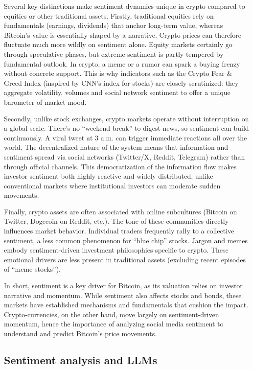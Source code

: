 \documentclass[
  a4paper]{article}
\begin{document}
Several key distinctions make sentiment dynamics unique in crypto
compared to equities or other traditional assets. Firstly, traditional
equities rely on fundamentals (earnings, dividends) that anchor
long-term value, whereas Bitcoin's value is essentially shaped by a
narrative. Crypto prices can therefore fluctuate much more wildly on
sentiment alone. Equity markets certainly go through speculative phases,
but extreme sentiment is partly tempered by fundamental outlook. In
crypto, a meme or a rumor can spark a buying frenzy without concrete
support. This is why indicators such as the Crypto Fear \& Greed Index
(inspired by CNN's index for stocks) are closely scrutinized: they
aggregate volatility, volumes and social network sentiment to offer a
unique barometer of market mood.

Secondly, unlike stock exchanges, crypto markets operate without
interruption on a global scale. There's no ``weekend break'' to digest
news, so sentiment can build continuously. A viral tweet at 3 a.m. can
trigger immediate reactions all over the world. The decentralized nature
of the system means that information and sentiment spread via social
networks (Twitter/X, Reddit, Telegram) rather than through official
channels. This democratization of the information flow makes investor
sentiment both highly reactive and widely distributed, unlike
conventional markets where institutional investors can moderate sudden
movements.

Finally, crypto assets are often associated with online subcultures
(Bitcoin on Twitter, Dogecoin on Reddit, etc.). The tone of these
communities directly influences market behavior. Individual traders
frequently rally to a collective sentiment, a less common phenomenon for
``blue chip'' stocks. Jargon and memes embody sentiment-driven
investment philosophies specific to crypto. These emotional drivers are
less present in traditional assets (excluding recent episodes of ``meme
stocks'').

In short, sentiment is a key driver for Bitcoin, as its valuation relies
on investor narrative and momentum. While sentiment also affects stocks
and bonds, these markets have established mechanisms and fundamentals
that cushion the impact. Crypto-currencies, on the other hand, move
largely on sentiment-driven momentum, hence the importance of analyzing
social media sentiment to understand and predict Bitcoin's price
movements.

\hypertarget{sentiment-analysis-and-llms}{%
\subsection{Sentiment analysis and
LLMs}\label{sentiment-analysis-and-llms}}
\end{document}
